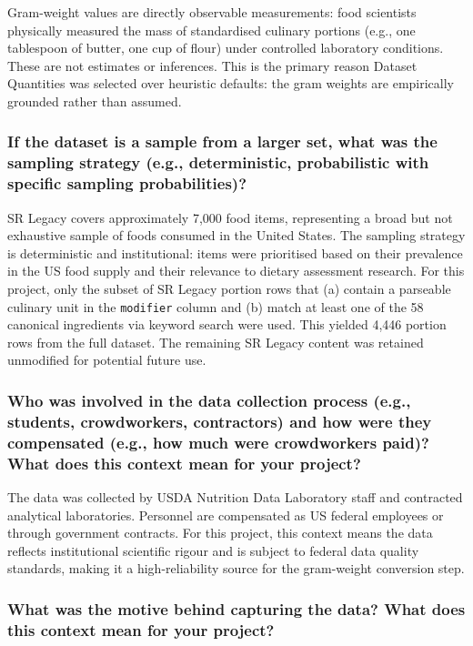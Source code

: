 \documentclass{article}
\newcommand{\question}[1]{#1}
\begin{document}
Gram-weight values are directly observable measurements: food scientists physically measured the mass of standardised culinary portions (e.g., one tablespoon of butter, one cup of flour) under controlled laboratory conditions. These are not estimates or inferences. This is the primary reason Dataset Quantities was selected over heuristic defaults: the gram weights are empirically grounded rather than assumed.

\question{\subsubsection*{If the dataset is a sample from a larger set, what was the sampling strategy (e.g., deterministic, probabilistic with specific sampling probabilities)?}}

SR Legacy covers approximately 7,000 food items, representing a broad but not exhaustive sample of foods consumed in the United States. The sampling strategy is deterministic and institutional: items were prioritised based on their prevalence in the US food supply and their relevance to dietary assessment research. For this project, only the subset of SR Legacy portion rows that (a) contain a parseable culinary unit in the \texttt{modifier} column and (b) match at least one of the 58 canonical ingredients via keyword search were used. This yielded 4,446 portion rows from the full dataset. The remaining SR Legacy content was retained unmodified for potential future use.

\question{\subsubsection*{Who was involved in the data collection process (e.g., students, crowdworkers, contractors) and how were they compensated (e.g., how much were crowdworkers paid)? What does this context mean for your project?}}

The data was collected by USDA Nutrition Data Laboratory staff and contracted analytical laboratories. Personnel are compensated as US federal employees or through government contracts. For this project, this context means the data reflects institutional scientific rigour and is subject to federal data quality standards, making it a high-reliability source for the gram-weight conversion step.

\question{\subsubsection*{What was the motive behind capturing the data? What does this context mean for your project?}}
\end{document}
